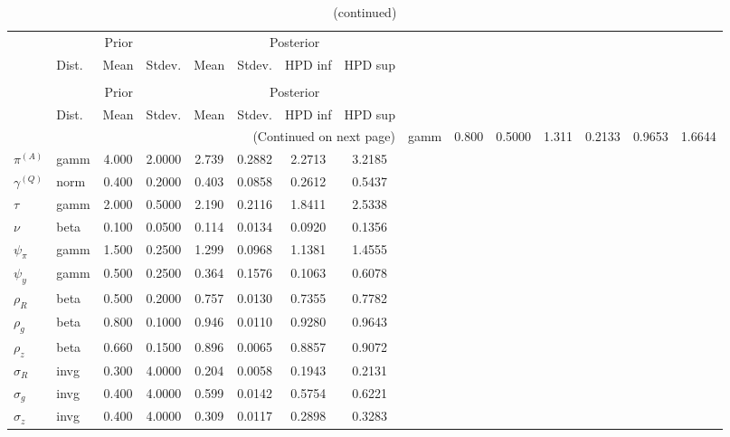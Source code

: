  
\begin{center}
\begin{longtable}{llcccccc} 
\caption{Results from Metropolis-Hastings (parameters)}
 \label{Table:MHPosterior:1}\\
\toprule 
  & \multicolumn{3}{c}{Prior}  &  \multicolumn{4}{c}{Posterior} \\
  \cmidrule(r{.75em}){2-4} \cmidrule(r{.75em}){5-8}
  & Dist. & Mean  & Stdev. & Mean & Stdev. & HPD inf & HPD sup\\
\midrule \endfirsthead 
\caption{(continued)}\\\toprule 
  & \multicolumn{3}{c}{Prior}  &  \multicolumn{4}{c}{Posterior} \\
  \cmidrule(r{.75em}){2-4} \cmidrule(r{.75em}){5-8}
  & Dist. & Mean  & Stdev. & Mean & Stdev. & HPD inf & HPD sup\\
\midrule \endhead 
\bottomrule \multicolumn{8}{r}{(Continued on next page)} \endfoot 
\bottomrule \endlastfoot 
${r_{A}}$ & gamm &   0.800 & 0.5000 &   1.311& 0.2133 &  0.9653 &  1.6644 \\ 
${\pi^{(A)}}$ & gamm &   4.000 & 2.0000 &   2.739& 0.2882 &  2.2713 &  3.2185 \\ 
${\gamma^{(Q)}}$ & norm &   0.400 & 0.2000 &   0.403& 0.0858 &  0.2612 &  0.5437 \\ 
${\tau}$ & gamm &   2.000 & 0.5000 &   2.190& 0.2116 &  1.8411 &  2.5338 \\ 
${\nu}$ & beta &   0.100 & 0.0500 &   0.114& 0.0134 &  0.0920 &  0.1356 \\ 
${\psi_\pi}$ & gamm &   1.500 & 0.2500 &   1.299& 0.0968 &  1.1381 &  1.4555 \\ 
${\psi_y}$ & gamm &   0.500 & 0.2500 &   0.364& 0.1576 &  0.1063 &  0.6078 \\ 
${\rho_R}$ & beta &   0.500 & 0.2000 &   0.757& 0.0130 &  0.7355 &  0.7782 \\ 
${\rho_{g}}$ & beta &   0.800 & 0.1000 &   0.946& 0.0110 &  0.9280 &  0.9643 \\ 
${\rho_z}$ & beta &   0.660 & 0.1500 &   0.896& 0.0065 &  0.8857 &  0.9072 \\ 
${\sigma_R}$ & invg &   0.300 & 4.0000 &   0.204& 0.0058 &  0.1943 &  0.2131 \\ 
${\sigma_{g}}$ & invg &   0.400 & 4.0000 &   0.599& 0.0142 &  0.5754 &  0.6221 \\ 
${\sigma_z}$ & invg &   0.400 & 4.0000 &   0.309& 0.0117 &  0.2898 &  0.3283 \\ 
\end{longtable}
 \end{center}
